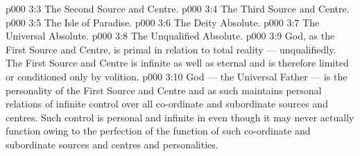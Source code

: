 \vs p000 3:3 \bibnobreakspace The Second Source and Centre.
\vs p000 3:4 \bibnobreakspace The Third Source and Centre.
\vs p000 3:5 \bibnobreakspace The Isle of Paradise.
\vs p000 3:6 \bibnobreakspace The Deity Absolute.
\vs p000 3:7 \bibnobreakspace The Universal Absolute.
\vs p000 3:8 \bibnobreakspace The Unqualified Absolute.
\vs p000 3:9 \pc God, as the First Source and Centre, is primal in relation to total reality --- unqualifiedly. The First Source and Centre is infinite as well as eternal and is therefore limited or conditioned only by volition.
\vs p000 3:10 God --- the Universal Father --- is the personality of the First Source and Centre and as such maintains personal relations of infinite control over all co\hyp{}ordinate and subordinate sources and centres. Such control is personal and infinite in  even though it may never actually function owing to the perfection of the function of such co\hyp{}ordinate and subordinate sources and centres and personalities.
